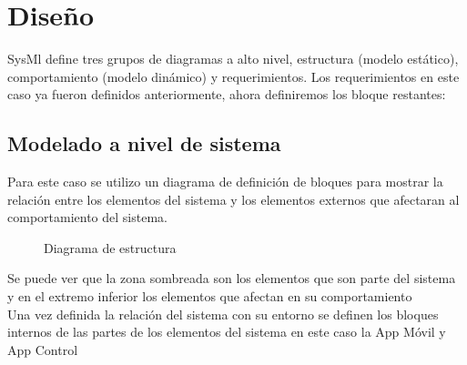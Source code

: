 \documentclass[16pt, article,notitlepage]{article}
\begin{document}
\section{Diseño}
SysMl define tres grupos de diagramas a alto nivel, estructura (modelo estático), comportamiento (modelo dinámico) y requerimientos. Los requerimientos en este caso ya fueron definidos anteriormente, ahora definiremos los bloque restantes: 
\subsection{Modelado a nivel de sistema}
Para este caso se utilizo un diagrama de definición de bloques para mostrar la relación entre los elementos del sistema y los elementos externos que afectaran al comportamiento del sistema.

\begin{figure}[H]
	\caption{Diagrama de estructura}
	
\end{figure}
Se puede ver que la zona sombreada son los elementos que son parte del sistema y en el extremo inferior los elementos que afectan en su comportamiento
\\
Una vez definida la relación del sistema con su entorno se definen los bloques internos de las partes de los elementos del sistema en este caso la App Móvil y App Control
\\
\end{document}
